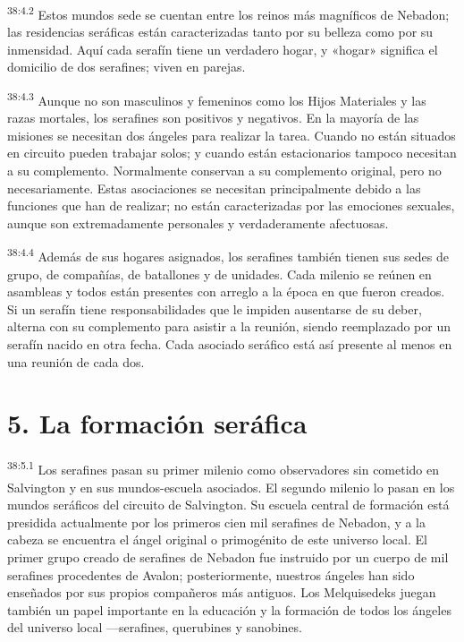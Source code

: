 \par
\textsuperscript{38:4.2} Estos mundos sede se cuentan entre los reinos más magníficos de Nebadon; las residencias seráficas están caracterizadas tanto por su belleza como por su inmensidad. Aquí cada serafín tiene un verdadero hogar, y «hogar» significa el domicilio de dos serafines; viven en parejas.

\par
\textsuperscript{38:4.3} Aunque no son masculinos y femeninos como los Hijos Materiales y las razas mortales, los serafines son positivos y negativos. En la mayoría de las misiones se necesitan dos ángeles para realizar la tarea. Cuando no están situados en circuito pueden trabajar solos; y cuando están estacionarios tampoco necesitan a su complemento. Normalmente conservan a su complemento original, pero no necesariamente. Estas asociaciones se necesitan principalmente debido a las funciones que han de realizar; no están caracterizadas por las emociones sexuales, aunque son extremadamente personales y verdaderamente afectuosas.

\par
\textsuperscript{38:4.4} Además de sus hogares asignados, los serafines también tienen sus sedes de grupo, de compañías, de batallones y de unidades. Cada milenio se reúnen en asambleas y todos están presentes con arreglo a la época en que fueron creados. Si un serafín tiene responsabilidades que le impiden ausentarse de su deber, alterna con su complemento para asistir a la reunión, siendo reemplazado por un serafín nacido en otra fecha. Cada asociado seráfico está así presente al menos en una reunión de cada dos.

\section*{5. La formación seráfica}
\par
\textsuperscript{38:5.1} Los serafines pasan su primer milenio como observadores sin cometido en Salvington y en sus mundos-escuela asociados. El segundo milenio lo pasan en los mundos seráficos del circuito de Salvington. Su escuela central de formación está presidida actualmente por los primeros cien mil serafines de Nebadon, y a la cabeza se encuentra el ángel original o primogénito de este universo local. El primer grupo creado de serafines de Nebadon fue instruido por un cuerpo de mil serafines procedentes de Avalon; posteriormente, nuestros ángeles han sido enseñados por sus propios compañeros más antiguos. Los Melquisedeks juegan también un papel importante en la educación y la formación de todos los ángeles del universo local ---serafines, querubines y sanobines.

